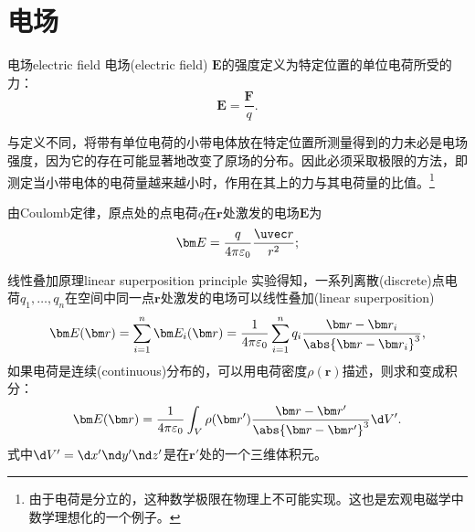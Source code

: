 
\section{电场}

\begin{definition}{电场}{electric field}
    电场(electric field) $\bm E$的强度定义为特定位置的单位电荷所受的力：
    \begin{equation}
        \bm E=\frac{\bm F}q.%
    \end{equation}
\end{definition}
\begin{remark}
    与定义不同，将带有单位电荷的小带电体放在特定位置所测量得到的力未必是电场强度，因为它的存在可能显著地改变了原场的分布。因此必须采取极限的方法，即测定当小带电体的电荷量越来越小时，作用在其上的力与其电荷量的比值。\footnote{由于电荷是分立的，这种数学极限在物理上不可能实现。这也是宏观电磁学中数学理想化的一个例子。}
\end{remark}

\begin{corollary}
    由Coulomb定律，原点处的点电荷$q$在$\bm r$处激发的电场$\bm E$为
    \begin{equation}
        \label{eqn:E of q}
        \bm E=\frac{q}{4\pi\varepsilon_0}\frac{\uvec r}{r^2};
    \end{equation}
\end{corollary}

\begin{theorem}
    {线性叠加原理}{linear superposition principle}
    实验得知，一系列离散(discrete)点电荷$q_1,\ldots,q_n$在空间中同一点$\bm r$处激发的电场可以线性叠加(linear superposition)
    \begin{equation}
        \label{eqn:E(r) sum}
        \bm E(\bm r)=\sum_{i=1}^n\bm E_i(\bm r)=\frac1{4\pi\varepsilon_0}\sum_{i=1}^nq_i\frac{\bm r-\bm r_i}{\abs{\bm r-\bm r_i}^3},
    \end{equation}
    如果电荷是连续(continuous)分布的，可以用电荷密度$\rho(\bm r)$描述，则求和变成积分：
    \begin{equation}
        \label{eqn:E(r)}
        \bm E(\bm r)=\frac1{4\pi\varepsilon_0}\int_V\rho(\bm r')\frac{\bm r-\bm r'}{\abs{\bm r-\bm r'}^3}\d V'.
    \end{equation}
    式中$\d V'=\d x'\nd y'\nd z'$是在$\bm r'$处的一个三维体积元。
\end{theorem}

